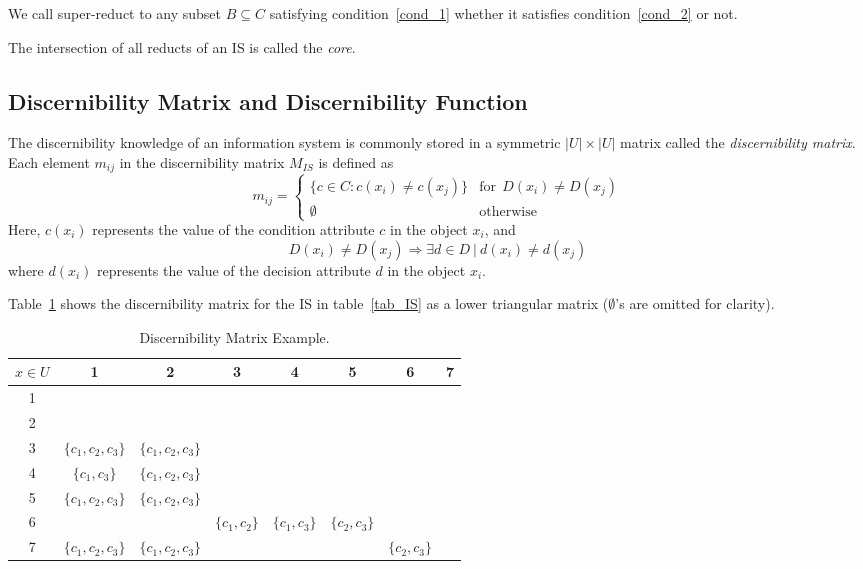 \documentclass[citenumber]{llncs}
\begin{document}
  We call super-reduct to any subset $B \subseteq C$ satisfying condition~\ref{cond_1} whether it satisfies
  condition~\ref{cond_2} or not.
  
  The intersection of all reducts of an IS is called the \textit{core}.
  
\subsection{Discernibility Matrix and Discernibility Function}
  The discernibility knowledge of an information system is commonly stored in a symmetric $|U| \times |U|$
  matrix called the \textit{discernibility matrix}. Each element $m_{ij}$ in the discernibility matrix 
  $M_{IS}$ is defined as   
  \begin{equation}
  	m_{ij}=\left\lbrace\begin{array}{cl}
  			\lbrace c \in C: c(x_i) \neq c(x_j) \rbrace & \mathrm{for~~}D(x_i) \neq D(x_j)\\
  			\emptyset 								   & \mathrm{otherwise} 
  	\end{array}\right.
  \end{equation}  
  Here, $c(x_i)$ represents the value of the condition attribute $c$ in the object $x_i$, and 
  $$D(x_i) \neq D(x_j) \Rightarrow \exists d \in D~ |~ d(x_i) \neq d(x_j)$$ 
  where $d(x_i)$ represents the value  of the decision attribute $d$ in the object $x_i$.
  
  Table~\ref{tab_DM} shows the discernibility matrix for the IS in table~\ref{tab_IS} as a lower triangular 
  matrix ($\emptyset$'s are omitted for clarity).
  
   \begin{table}[htb]
		\caption{Discernibility Matrix Example.} \label{tab_DM}
		\centering
 	\begin{tabular}{c|ccccccc}
 		$x \in U$ & 1 & 2 &  3 & 4 & 5 &  6 & 7\\
 		\hline
		1 &&&&&&&\\
		2 &&&&&&&\\
		3 & $\lbrace c_1,c_2,c_3\rbrace$ & $\lbrace c_1,c_2,c_3\rbrace$ &&&&&\\
		4 & $\lbrace c_1,c_3\rbrace$ & $\lbrace c_1,c_2,c_3\rbrace$ &&&&&\\
		5 & $\lbrace c_1,c_2,c_3\rbrace$ & $\lbrace c_1,c_2,c_3\rbrace$ &&&&&\\
		6 &&& $\lbrace c_1,c_2\rbrace$ & $\lbrace c_1,c_3\rbrace$ & $\lbrace c_2,c_3\rbrace$ &&\\
		7 & $\lbrace c_1,c_2,c_3\rbrace$ & $\lbrace c_1,c_2,c_3\rbrace$ &&&& $\lbrace c_2,c_3\rbrace$ &\\
 	\end{tabular}             
 \end{table}
  
\end{document}
